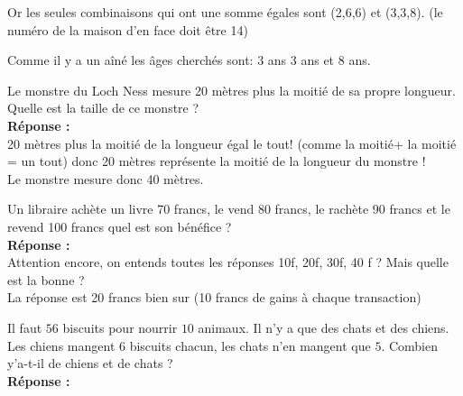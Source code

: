 \documentclass[twocolumn]{article}
\begin{document}
Or les seules combinaisons qui ont une somme égales sont (2,6,6) et (3,3,8). 
(le numéro de la maison d'en face doit être 14)

Comme il y a un aîné les âges cherchés sont: 3 ans 3 ans et 8 ans.

\par
\vspace{3mm}

\exo
\par
Le monstre du Loch Ness mesure 20 mètres plus la moitié de sa propre longueur.
Quelle est la taille de ce monstre ?\\

\textbf{Réponse :}\\

20 mètres plus la moitié de la longueur égal le tout! (comme la moitié+ la moitié = un tout)
donc 20 mètres représente la moitié de la longueur du monstre !\\
Le monstre mesure donc 40 mètres.

\par
\vspace{3mm}

\exo
\par
Un libraire achète un livre 70 francs, le vend 80 francs, le rachète 90 
francs et le revend 100 francs quel est son bénéfice ?\\

\textbf{Réponse :}\\

Attention encore, on entends toutes les réponses 10f, 20f, 30f, 40 f ?
Mais quelle est la bonne ?\\

La réponse est 20 francs bien sur (10 francs de gains à chaque transaction)

\par
\vspace{3mm}

\exo
\par
Il faut $56$ biscuits pour nourrir $10$ animaux. Il n'y a que des chats et des 
chiens. Les chiens mangent $6$ biscuits chacun, les chats n'en mangent que $5$. 
Combien y'a-t-il de chiens et de chats ?\\

\textbf{Réponse :}\\
\end{document}
